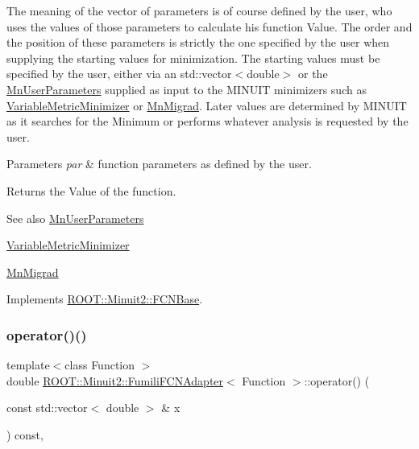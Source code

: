 The meaning of the vector of parameters is of course defined by the user, who uses the values of those parameters to calculate his function Value. The order and the position of these parameters is strictly the one specified by the user when supplying the starting values for minimization. The starting values must be specified by the user, either via an std\+::vector$<$double$>$ or the \mbox{\hyperlink{classROOT_1_1Minuit2_1_1MnUserParameters}{Mn\+User\+Parameters}} supplied as input to the M\+I\+N\+U\+IT minimizers such as \mbox{\hyperlink{classROOT_1_1Minuit2_1_1VariableMetricMinimizer}{Variable\+Metric\+Minimizer}} or \mbox{\hyperlink{classROOT_1_1Minuit2_1_1MnMigrad}{Mn\+Migrad}}. Later values are determined by M\+I\+N\+U\+IT as it searches for the Minimum or performs whatever analysis is requested by the user.


\begin{DoxyParams}{Parameters}
{\em par} & function parameters as defined by the user.\\
\hline
\end{DoxyParams}
\begin{DoxyReturn}{Returns}
the Value of the function.
\end{DoxyReturn}
\begin{DoxySeeAlso}{See also}
\mbox{\hyperlink{classROOT_1_1Minuit2_1_1MnUserParameters}{Mn\+User\+Parameters}} 

\mbox{\hyperlink{classROOT_1_1Minuit2_1_1VariableMetricMinimizer}{Variable\+Metric\+Minimizer}} 

\mbox{\hyperlink{classROOT_1_1Minuit2_1_1MnMigrad}{Mn\+Migrad}} 
\end{DoxySeeAlso}


Implements \mbox{\hyperlink{classROOT_1_1Minuit2_1_1FCNBase_ae4a86bd94d0d0f5ca6fc8f8ab2bb43cd}{R\+O\+O\+T\+::\+Minuit2\+::\+F\+C\+N\+Base}}.

\mbox{\label{classROOT_1_1Minuit2_1_1FumiliFCNAdapter_a7381e9f93fbec9e0504e3e340c281056}} 
\subsubsection{\texorpdfstring{operator()()}{operator()()}\hspace{0.1cm}{\footnotesize\ttfamily [3/6]}}
{\footnotesize\ttfamily template$<$class Function $>$ \\
double \mbox{\hyperlink{classROOT_1_1Minuit2_1_1FumiliFCNAdapter}{R\+O\+O\+T\+::\+Minuit2\+::\+Fumili\+F\+C\+N\+Adapter}}$<$ Function $>$\+::operator() (\begin{DoxyParamCaption}\item[{const std\+::vector$<$ double $>$ \&}]{x }\end{DoxyParamCaption}) const\hspace{0.3cm}{\ttfamily [inline]}, {\ttfamily [virtual]}}

